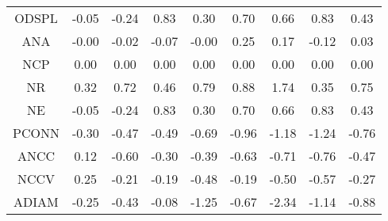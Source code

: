 \begin{longtable}{ | c || c | c | c | c | c | c | c || c |}
ODSPL &  \cellcolor[HTML]{FFFFFF} -0.05 &  \cellcolor[HTML]{FFF7F7} -0.24 &  \cellcolor[HTML]{E7E7FF} 0.83 &  \cellcolor[HTML]{F7F7FF} 0.30 &  \cellcolor[HTML]{EFEFFF} 0.70 &  \cellcolor[HTML]{EFEFFF} 0.66 &  \cellcolor[HTML]{E7E7FF} 0.83 &  \cellcolor[HTML]{F7F7FF} 0.43 \\
ANA &  \cellcolor[HTML]{FFFFFF} -0.00 &  \cellcolor[HTML]{FFFFFF} -0.02 &  \cellcolor[HTML]{FFFFFF} -0.07 &  \cellcolor[HTML]{FFFFFF} -0.00 &  \cellcolor[HTML]{F7F7FF} 0.25 &  \cellcolor[HTML]{F7F7FF} 0.17 &  \cellcolor[HTML]{FFFFFF} -0.12 &  \cellcolor[HTML]{FFFFFF} 0.03 \\
NCP &  \cellcolor[HTML]{FFFFFF} 0.00 &  \cellcolor[HTML]{FFFFFF} 0.00 &  \cellcolor[HTML]{FFFFFF} 0.00 &  \cellcolor[HTML]{FFFFFF} 0.00 &  \cellcolor[HTML]{FFFFFF} 0.00 &  \cellcolor[HTML]{FFFFFF} 0.00 &  \cellcolor[HTML]{FFFFFF} 0.00 &  \cellcolor[HTML]{FFFFFF} 0.00 \\
NR &  \cellcolor[HTML]{F7F7FF} 0.32 &  \cellcolor[HTML]{EFEFFF} 0.72 &  \cellcolor[HTML]{F7F7FF} 0.46 &  \cellcolor[HTML]{EFEFFF} 0.79 &  \cellcolor[HTML]{E7E7FF} 0.88 &  \cellcolor[HTML]{D7D7FF} 1.74 &  \cellcolor[HTML]{F7F7FF} 0.35 &  \cellcolor[HTML]{EFEFFF} 0.75 \\
NE &  \cellcolor[HTML]{FFFFFF} -0.05 &  \cellcolor[HTML]{FFF7F7} -0.24 &  \cellcolor[HTML]{E7E7FF} 0.83 &  \cellcolor[HTML]{F7F7FF} 0.30 &  \cellcolor[HTML]{EFEFFF} 0.70 &  \cellcolor[HTML]{EFEFFF} 0.66 &  \cellcolor[HTML]{E7E7FF} 0.83 &  \cellcolor[HTML]{F7F7FF} 0.43 \\
PCONN &  \cellcolor[HTML]{FFF7F7} -0.30 &  \cellcolor[HTML]{FFF7F7} -0.47 &  \cellcolor[HTML]{FFEFEF} -0.49 &  \cellcolor[HTML]{FFEFEF} -0.69 &  \cellcolor[HTML]{FFE7E7} -0.96 &  \cellcolor[HTML]{FFDFDF} -1.18 &  \cellcolor[HTML]{FFDFDF} -1.24 &  \cellcolor[HTML]{FFEFEF} -0.76 \\
ANCC &  \cellcolor[HTML]{FFFFFF} 0.12 &  \cellcolor[HTML]{FFEFEF} -0.60 &  \cellcolor[HTML]{FFF7F7} -0.30 &  \cellcolor[HTML]{FFF7F7} -0.39 &  \cellcolor[HTML]{FFEFEF} -0.63 &  \cellcolor[HTML]{FFEFEF} -0.71 &  \cellcolor[HTML]{FFEFEF} -0.76 &  \cellcolor[HTML]{FFF7F7} -0.47 \\
NCCV &  \cellcolor[HTML]{F7F7FF} 0.25 &  \cellcolor[HTML]{FFF7F7} -0.21 &  \cellcolor[HTML]{FFF7F7} -0.19 &  \cellcolor[HTML]{FFEFEF} -0.48 &  \cellcolor[HTML]{FFF7F7} -0.19 &  \cellcolor[HTML]{FFEFEF} -0.50 &  \cellcolor[HTML]{FFEFEF} -0.57 &  \cellcolor[HTML]{FFF7F7} -0.27 \\
ADIAM &  \cellcolor[HTML]{FFF7F7} -0.25 &  \cellcolor[HTML]{FFF7F7} -0.43 &  \cellcolor[HTML]{FFFFFF} -0.08 &  \cellcolor[HTML]{FFDFDF} -1.25 &  \cellcolor[HTML]{FFEFEF} -0.67 &  \cellcolor[HTML]{FFC7C7} -2.34 &  \cellcolor[HTML]{FFDFDF} -1.14 &  \cellcolor[HTML]{FFE7E7} -0.88 \\

\end{longtable}
